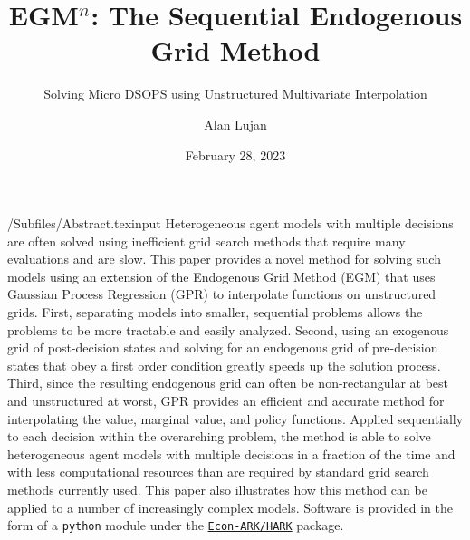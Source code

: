 \documentclass[SequentialEGM]{subfiles}
\begin{document}

\title{EGM$^n$: The Sequential Endogenous Grid Method}
\subtitle{Solving Micro DSOPS using Unstructured Multivariate Interpolation}

\author{Alan Lujan\authNum}



\renewcommand{\forcedate}{February 28, 2023}\date{\forcedate}

\maketitle

\hypertarget{abstract}{}
\begin{verbatimwrite}{\econtexRoot/Subfiles/Abstract.texinput}
    Heterogeneous agent models with multiple decisions are often solved using inefficient grid search methods that require many evaluations and are slow.
    This paper provides a novel method for solving such models using an extension of the Endogenous Grid Method (EGM) that uses Gaussian Process Regression (GPR) to interpolate functions on unstructured grids.
    First, separating models into smaller, sequential problems allows the problems to be more tractable and easily analyzed.
    Second, using an exogenous grid of post-decision states and solving for an endogenous grid of pre-decision states that obey a first order condition greatly speeds up the solution process.
    Third, since the resulting endogenous grid can often be non-rectangular at best and unstructured at worst, GPR provides an efficient and accurate method for interpolating the value, marginal value, and policy functions.
    Applied sequentially to each decision within the overarching problem, the method is able to solve heterogeneous agent models with multiple decisions in a fraction of the time and with less computational resources than are required by standard grid search methods currently used.
    This paper also illustrates how this method can be applied to a number of increasingly complex models. Software is provided in the form of a \texttt{python} module under the \href{https://econ-ark/HARK}{\texttt{Econ-ARK/HARK}} package.
\end{verbatimwrite}

\end{document}
